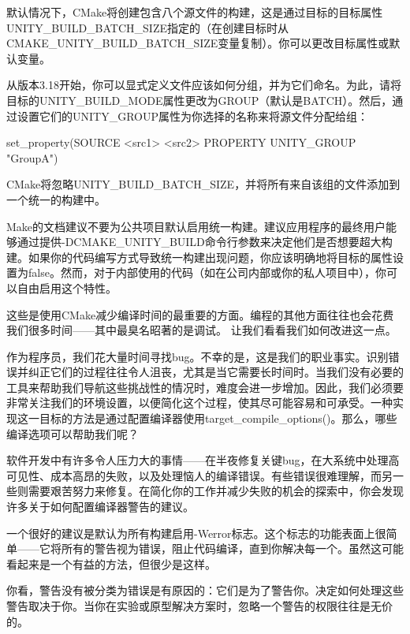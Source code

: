 默认情况下，CMake将创建包含八个源文件的构建，这是通过目标的目标属性UNITY\_BUILD\_BATCH\_SIZE指定的（在创建目标时从CMAKE\_UNITY\_BUILD\_BATCH\_SIZE变量复制）。你可以更改目标属性或默认变量。

从版本3.18开始，你可以显式定义文件应该如何分组，并为它们命名。为此，请将目标的UNITY\_BUILD\_MODE属性更改为GROUP（默认是BATCH）。然后，通过设置它们的UNITY\_GROUP属性为你选择的名称来将源文件分配给组：

\begin{shell}
set_property(SOURCE <src1> <src2> PROPERTY UNITY_GROUP "GroupA")
\end{shell}

CMake将忽略UNITY\_BUILD\_BATCH\_SIZE，并将所有来自该组的文件添加到一个统一的构建中。

Make的文档建议不要为公共项目默认启用统一构建。建议应用程序的最终用户能够通过提供-DCMAKE\_UNITY\_BUILD命令行参数来决定他们是否想要超大构建。如果你的代码编写方式导致统一构建出现问题，你应该明确地将目标的属性设置为false。然而，对于内部使用的代码（如在公司内部或你的私人项目中），你可以自由启用这个特性。

这些是使用CMake减少编译时间的最重要的方面。编程的其他方面往往也会花费我们很多时间——其中最臭名昭著的是调试。 让我们看看我们如何改进这一点。


作为程序员，我们花大量时间寻找bug。不幸的是，这是我们的职业事实。识别错误并纠正它们的过程往往令人沮丧，尤其是当它需要长时间时。当我们没有必要的工具来帮助我们导航这些挑战性的情况时，难度会进一步增加。因此，我们必须要非常关注我们的环境设置，以便简化这个过程，使其尽可能容易和可承受。一种实现这一目标的方法是通过配置编译器使用target\_compile\_options()。那么，哪些编译选项可以帮助我们呢？


软件开发中有许多令人压力大的事情——在半夜修复关键bug，在大系统中处理高可见性、成本高昂的失败，以及处理恼人的编译错误。有些错误很难理解，而另一些则需要艰苦努力来修复。在简化你的工作并减少失败的机会的探索中，你会发现许多关于如何配置编译器警告的建议。

一个很好的建议是默认为所有构建启用-Werror标志。这个标志的功能表面上很简单——它将所有的警告视为错误，阻止代码编译，直到你解决每一个。虽然这可能看起来是一个有益的方法，但很少是这样。

你看，警告没有被分类为错误是有原因的：它们是为了警告你。决定如何处理这些警告取决于你。当你在实验或原型解决方案时，忽略一个警告的权限往往是无价的。

